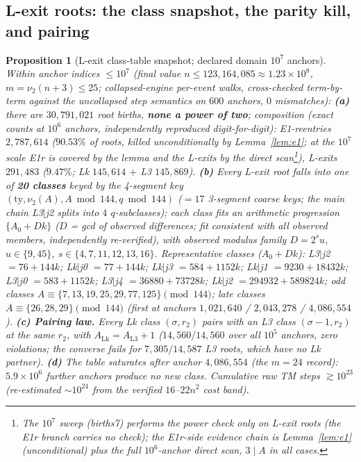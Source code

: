 \documentclass[11pt]{amsart}
\newtheorem{proposition}[theorem]{Proposition}
\theoremstyle{definition}
\newcommand{\vtwo}[1]{\nu_2(#1)}
\begin{document}
\subsection{L-exit roots: the class snapshot, the parity kill, and pairing}

\begin{proposition}[L-exit class-table snapshot; declared domain $10^{7}$
anchors]\label{prop:classes}
Within anchor indices $\le10^{7}$ (final value $n\le123{,}164{,}085\approx
1.23\times10^{8}$, $m=\vtwo{n+3}\le25$; collapsed-engine per-event walks,
cross-checked term-by-term against the uncollapsed step semantics on $600$
anchors, $0$ mismatches):
\textbf{(a)} there are $30{,}791{,}021$ root births, \textbf{none a power of
two}; composition (exact counts at $10^{6}$ anchors, independently reproduced
digit-for-digit): E1-reentries $2{,}787{,}614$ ($90.53\%$ \emph{of roots},
killed unconditionally by Lemma~\ref{lem:e1}; at the $10^{7}$ scale E1r is
covered by the lemma and the L-exits by the direct scan\footnote{The $10^{7}$
sweep (births7) performs the power check only on L-exit roots (the E1r branch
carries no check); the E1r-side evidence chain is Lemma~\ref{lem:e1}
(unconditional) plus the full $10^{6}$-anchor direct scan, $3\mid A$ in all
cases.}), L-exits $291{,}483$ ($9.47\%$; Lk $145{,}614$ $+$ L3 $145{,}869$).
\textbf{(b)} Every L-exit root falls into one of \textbf{20 classes} keyed by
the 4-segment key $(\mathrm{ty},\vtwo{A},A\bmod144,q\bmod144)$ ($=17$
3-segment coarse keys; the main chain L3$|$j2 splits into $4$ $q$-subclasses);
each class fits an arithmetic progression $\{A_0+Dk\}$ ($D$ = gcd of observed
differences; fit consistent with all observed members, independently
re-verified), with observed modulus family $D=2^{s}u$, $u\in\{9,45\}$,
$s\in\{4,7,11,12,13,16\}$. Representative classes ($A_0+Dk$): L3$|$j2
$=76+144k$; Lk$|$j0 $=77+144k$; Lk$|$j3 $=584+1152k$; Lk$|$j1
$=9230+18432k$; L3$|$j0 $=583+1152k$; L3$|$j4 $=36880+73728k$; Lk$|$j2
$=294932+589824k$; odd classes $A\equiv\{7,13,19,25,29,77,125\}\pmod{144}$;
late classes $A\equiv\{26,28,29\}\pmod{144}$ (first at anchors
$1{,}021{,}640$ / $2{,}043{,}278$ / $4{,}086{,}554$).
\textbf{(c) Pairing law.} Every Lk class $(\sigma,r_2)$ pairs with an L3
class $(\sigma{-}1,r_2)$ at the same $r_2$, with
$A_{\mathrm{Lk}}=A_{\mathrm{L3}}+1$ ($14{,}560/14{,}560$ over all $10^{5}$
anchors, zero violations; the converse fails for $7{,}305/14{,}587$ L3 roots,
which have no Lk partner).
\textbf{(d)} The table saturates after anchor $4{,}086{,}554$ (the $m{=}24$
record): $5.9\times10^{6}$ further anchors produce no new class. Cumulative
raw TM steps $\gtrsim10^{23}$ (re-estimated $\sim10^{24}$ from the verified
$16$--$22n^{2}$ cost band).
\end{proposition}
\end{document}
